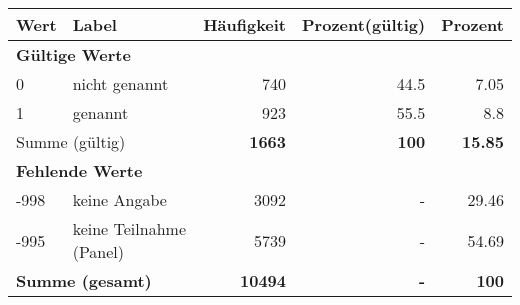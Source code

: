      \begin{longtable}{lXrrr}
     \toprule
     \textbf{Wert} & \textbf{Label} & \textbf{Häufigkeit} & \textbf{Prozent(gültig)} & \textbf{Prozent} \\
     \endhead
     \midrule
     \multicolumn{5}{l}{\textbf{Gültige Werte}}\\

     0 &
     \multicolumn{1}{X}{ nicht genannt   } &


       \num{740} &
       \num[round-mode=places,round-precision=2]{44.5} &
         \num[round-mode=places,round-precision=2]{7.05} \\

     1 &
     \multicolumn{1}{X}{ genannt   } &


       \num{923} &
       \num[round-mode=places,round-precision=2]{55.5} &
         \num[round-mode=places,round-precision=2]{8.8} \\
     \midrule
     \multicolumn{2}{l}{Summe (gültig)} &
       \textbf{\num{1663}} &
     \textbf{\num{100}} &
       \textbf{\num[round-mode=places,round-precision=2]{15.85}} \\
     \multicolumn{5}{l}{\textbf{Fehlende Werte}}\\
       -998 &
       keine Angabe &
         \num{3092} &
        - &
         \num[round-mode=places,round-precision=2]{29.46} \\
       -995 &
       keine Teilnahme (Panel) &
         \num{5739} &
        - &
         \num[round-mode=places,round-precision=2]{54.69} \\
     \midrule
     \multicolumn{2}{l}{\textbf{Summe (gesamt)}} &
          \textbf{\num{10494}} &
        \textbf{-} &
        \textbf{\num{100}} \\
     \bottomrule
     \end{longtable}
     
